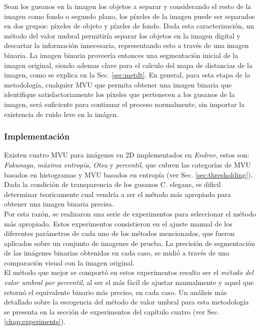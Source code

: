 Sean los gusanos en la imagen los objetos a separar y considerando el resto de la imagen
como fondo o segundo plano, los p\'ixeles de la imagen puede ser separados en dos grupos: 
p\'ixeles de objeto y p\'ixeles de fondo. Dada esta caracterizaci\'on, un m\'etodo del valor
umbral permitir\'ia separar los objetos en la imagen digital y descartar la informaci\'on
innecesaria, representando esto a trav\'es de una imagen binaria. La imagen binaria proveer\'ia
entonces una segmentaci\'on inicial de la imagen original, siendo ademas clave para el
calculo del mapa de distancias de la imagen, como se explica en la Sec. \ref{sec:metdt}.
En general, para esta etapa de la metodolog\'ia, cualquier MVU que permita obtener una imagen
binaria que identifique satisfactoriamente los p\'ixeles que pertenecen a los gusanos de la
imagen, ser\'a suficiente para continuar el proceso normalmente, sin importar la existencia
de ruido leve en la im\'agen.


\subsubsection*{Implementaci\'on}
\label{sec:thresimp}

Existen cuatro MVU para im\'agenes en 2D implementados en \emph{Endrov},
estos son: \emph{Fukunaga}, \emph{m\'axima entrop\'ia}, \emph{Otsu} y \emph{percentil},
que cubren las categor\'ias de MVU basados en histogramas y MVU basados en entrop\'ia 
(ver Sec. \ref{sec:thresholding}). Dada la condici\'on de transparencia de los gusanos
C. elegans, es dificil determinar teoricamente cual vendr\'ia a ser el m\'etodo m\'as apropiado 
para obtener una imagen binaria precisa. \\
Por esta raz\'on, se realizaron una serie de experimentos
para seleccionar el m\'etodo m\'as apropiado. Estos experimentos consistieron en el ajuste manual
de los diferentes par\'ametros de cada uno de los m\'etodos mencionados, que fueron aplicados
sobre un conjunto de imagenes de prueba. La precisi\'on de segmentaci\'on de las im\'agenes binarias
obtenidas en cada caso, se midi\'o a trav\'es de una comparaci\'on visual con la imagen original.\\
El m\'etodo que mejor se comport\'o en estos experimentos resulto ser el 
\emph{m\'etodo del valor umbral por percentil}, 
al ser el m\'as f\'acil de ajustar manualmente y aquel que retorn\'o el equivalente binario m\'as preciso, 
en cada caso. Un an\'alisis m\'as detallado sobre la escogencia del m\'etodo de valor umbral para esta metodolog\'ia
se presenta en la secci\'on de experimentos del cap\'itulo cuatro (ver Sec. \ref{chap:experiments}).\\

